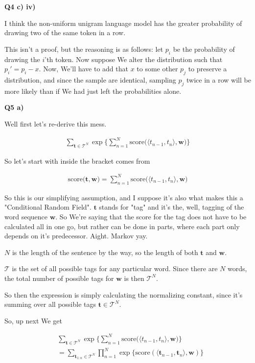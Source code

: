 \documentclass{article}
\begin{document}
\textbf{Q4 c) iv)}		
	
	I think the non-uniform unigram language model has the greater probability of drawing two of the same token in a row. 
	
	This isn't a proof, but the reasoning is as follows: let $p_i$ be the probability of drawing the $i$'th token. Now suppose We alter the distribution such that $p_i' = p_i - x$. Now, We'll have to add that $x$ to some other $p_j$ to preserve a distribution, and since the sample are identical, sampling $p_j$ twice in a row will be more likely than if We had just left the probabilities alone.
	
	
\newpage

\textbf{Q5 a)}

	Well first let's re-derive this mess.
	
	\begin{align}
		\sum_{\mathbf{t}\in\mathcal{T}^N} \exp\bigg\{ \sum^N_{n=1} \text{score}\big( \langle t_{n-1}, t_n \rangle, \mathbf{w} \big) \bigg\}
	\end{align}	
	
	So let's start with inside the bracket comes from
	
	\begin{align}
		\text{score}\big(\mathbf{t}, \mathbf{w} \big) = \sum^N_{n=1} \text{score}\big( \langle t_{n-1}, t_n \rangle, \mathbf{w} \big)
	\end{align}
	
	So this is our simplifying assumption, and I suppose it's also what makes this a "Conditional Random Field". $\mathbf{t}$ stands for "tag" and it's the, well, tagging of the word sequence $\mathbf{w}$. So We're saying that the score for  the tag does not have to be calculated all in one go, but rather can be done in parts, where each part only depends on it's predecessor. Aight. Markov yay.
	
	$N$ is the length of the sentence by the way, so the length of both $\mathbf{t}$ and $\mathbf{w}$. 
	
	$\mathcal{T}$ is the set of all possible tags for any particular word. Since there are $N$ words, the total number of possible tags for $\mathbf{w}$ is then $\mathcal{T}^N$.
	
	So then the expression is simply calculating the normalizing constant, since it's summing over all possible tags $\mathbf{t}\in\mathcal{T}^N$.
	
	So, up next We get
	
	\begin{align}
		&\sum_{\mathbf{t}\in\mathcal{T}^N} \exp\bigg\{ \sum^N_{n=1} \text{score}\big( \langle t_{n-1}, t_n \rangle, \mathbf{w} \big) \bigg\}\\
		&= \sum_{\mathbf{t}_{1:n}\in\mathcal{T}^N} \prod^N_{n=1} \exp \big\{ \text{score}(\langle \mathbf{t}_{n-1}, \mathbf{t}_n \rangle, \mathbf{w}) \big\}
	\end{align}	
	
\end{document}
